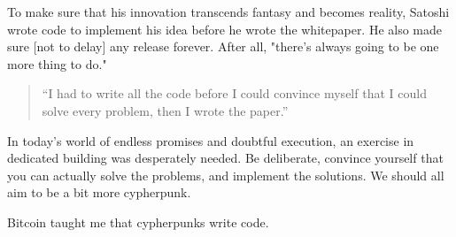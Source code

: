 
To make sure that his innovation transcends fantasy and becomes reality,
Satoshi wrote code to implement his idea before he wrote the whitepaper.
He also made sure [not to delay] any release forever. After all,
"there's always going to be one more thing to do."

\begin{quotation}
``I had to write all the code before I could convince myself that I
could solve every problem, then I wrote the paper.''
\end{quotation}

In today's world of endless promises and doubtful execution, an exercise
in dedicated building was desperately needed. Be deliberate, convince
yourself that you can actually solve the problems, and implement the
solutions. We should all aim to be a bit more cypherpunk.

Bitcoin taught me that cypherpunks write code.

%
%
%
%
